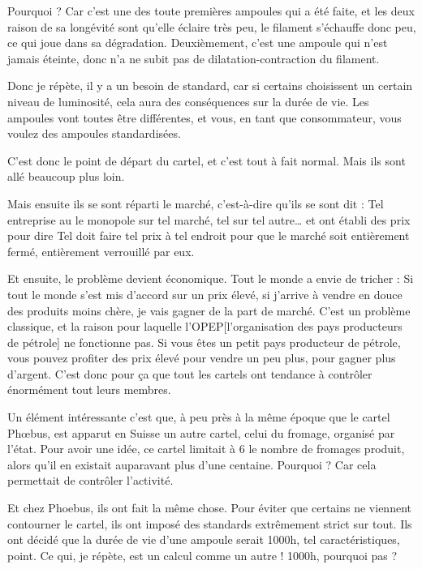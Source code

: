 \begin{small}
Pourquoi ? Car c'est une des toute premières ampoules qui a été faite, et les deux raison de sa longévité sont qu'elle éclaire très peu, le filament s'échauffe donc peu, ce qui joue dans sa dégradation. Deuxièmement, c'est une ampoule qui n'est jamais éteinte, donc n'a ne subit pas de dilatation-contraction du filament.

Donc je répète, il y a un besoin de standard, car si certains choisissent un certain niveau de luminosité, cela aura des conséquences sur la durée de vie.
Les ampoules vont toutes être différentes, et vous, en tant que consommateur, vous voulez des ampoules standardisées.

\medbreak

C'est  donc le point de départ du cartel, et c'est tout à fait normal. Mais ils sont allé beaucoup plus loin.

Mais ensuite ils se sont réparti le marché, c'est-à-dire qu'ils se sont dit : \og  
Tel entreprise au le monopole sur tel marché, tel sur tel autre\dots  \fg{} et ont établi des prix pour dire  \og Tel doit faire tel prix à tel endroit  \fg{} pour que le marché soit entièrement fermé, entièrement verrouillé par eux.

 Et ensuite, le problème devient économique. Tout le monde a envie de tricher : Si tout le monde s'est mis d'accord sur un prix élevé, si j'arrive à vendre en douce des produits moins chère, je vais gagner de la part de marché. C'est un problème classique, et la raison pour laquelle l'OPEP[l'organisation des pays producteurs de pétrole] ne fonctionne pas. Si vous êtes un petit pays producteur de pétrole, vous pouvez profiter des prix élevé pour vendre un peu plus, pour gagner plus d'argent.  C'est donc pour ça que tout les cartels ont tendance à contrôler énormément tout leurs membres.
 
\smallbreak 
 
Un élément intéressante c'est que, à peu près à la même époque que le cartel Phœbus, est apparut en Suisse un autre cartel, celui du fromage, organisé par l'état. Pour avoir une idée, ce cartel limitait à 6 le nombre de fromages produit, alors qu'il en existait auparavant plus d'une centaine. Pourquoi ? Car cela permettait de contrôler l'activité.

\smallbreak

Et chez Phoebus, ils ont fait la même chose. Pour éviter que certains ne viennent contourner le cartel, ils ont imposé des standards extrêmement strict sur tout.
Ils ont décidé que la durée de vie d'une ampoule serait 1000h, tel caractéristiques, point. Ce qui, je répète, est un calcul comme un autre ! 1000h, pourquoi pas ?


\end{small}
